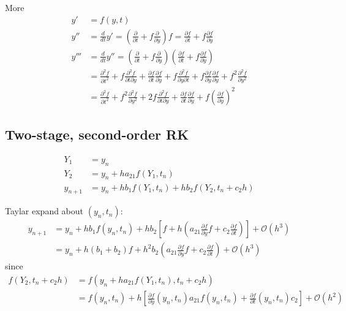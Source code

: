 \documentclass[prd,aps,a4paper,superscriptaddress,onecolumn,footinbib]{revtex4}
\begin{document}
More
\begin{align}
    y'
    &=f(y,t)
    \\
    y''
    &=\frac{d}{dt}y'
    =\left(\frac{\partial}{\partial t}+f\frac{\partial}{\partial y}\right)f
    =\frac{\partial f}{\partial t}+f\frac{\partial f}{\partial y}
    \\
    y'''
    &=\frac{d}{dt}y''
    =\left(\frac{\partial}{\partial t}+f\frac{\partial}{\partial y}\right)
    \left(\frac{\partial f}{\partial t}+f\frac{\partial f}{\partial y}\right)
    \\
    &=\frac{\partial^2f}{\partial t^2}
    +f\frac{\partial^2f}{\partial t\partial y}
    +\frac{\partial f}{\partial t}\frac{\partial f}{\partial y}
    +f\frac{\partial^2f}{\partial y \partial t}
    +f\frac{\partial f}{\partial y}\frac{\partial f}{\partial y}
    +f^2\frac{\partial^2 f}{\partial y^2}
    \\
    &=\frac{\partial^2f}{\partial t^2}
    +f^2\frac{\partial^2 f}{\partial y^2}
    +2f\frac{\partial^2f}{\partial t\partial y}
    +\frac{\partial f}{\partial t}\frac{\partial f}{\partial y}
    +f\left(\frac{\partial f}{\partial y}\right)^2
\end{align}

\subsection{Two-stage, second-order RK}

\begin{align}
    Y_1&=y_n \\
    Y_2&=y_n+h a_{21}f(Y_1, t_n) \\
    y_{n+1}
       &=y_n+h b_1f(Y_1, t_n)+h b_2f(Y_2, t_n+c_2h)
\end{align}

Taylar expand about $(y_n, t_n)$:
\begin{align}
    y_{n+1}
    &=y_n + h b_1 f(y_n, t_n) + h b_2
    \left[
        f + h
        \left(
            a_{21} \frac{\partial f}{\partial y} f + c_2\frac{\partial f}{\partial t}
        \right)
    \right]
    + \mathcal{O}(h^3)
    \\
    &=y_n + h(b_1+b_2)f + h^2 b_2
    \left(a_{21}\frac{\partial f}{\partial y}f + c_2\frac{\partial f}{\partial t}\right)
    + \mathcal{O}(h^3)
\end{align}
since
\begin{align}
    f(Y_2, t_n+c_2h)
    &=f(y_n+h a_{21}f(Y_1, t_n), t_n+c_2h) \\
    &=f(y_n, t_n) + h
    \left[
        \frac{\partial f}{\partial y}(y_n, t_n) a_{21}f(y_n, t_n)
        +\frac{\partial f}{\partial t}(y_n, t_n) c_2
    \right]
    + \mathcal{O}(h^2)
\end{align}
\end{document}
